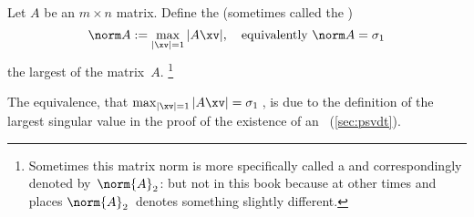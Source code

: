 \begin{definition} \label{def:norm} 
Let \(A\) be an \(m\times n\) matrix.  
Define the  (sometimes called the )
\begin{equation}
\norm A:=\max_{|\xv|=1}|A\xv|, 
\quad\text{equivalently }\norm A=\sigma_1
\label{eq:}
\end{equation}
the largest  of the matrix~\(A\).
\footnote{Sometimes this matrix norm is more specifically called a  and correspondingly denoted by~\(\norm{A}_2\): but not in this book because at other times and places \(\norm{A}_2\)~denotes something slightly different.}
\end{definition}
The equivalence, that \(\max_{|\xv|=1}|A\xv|=\sigma_1\)\,, is due to the definition of the largest singular value in the proof of the existence of an \svd\ (\autoref{sec:psvdt}).



